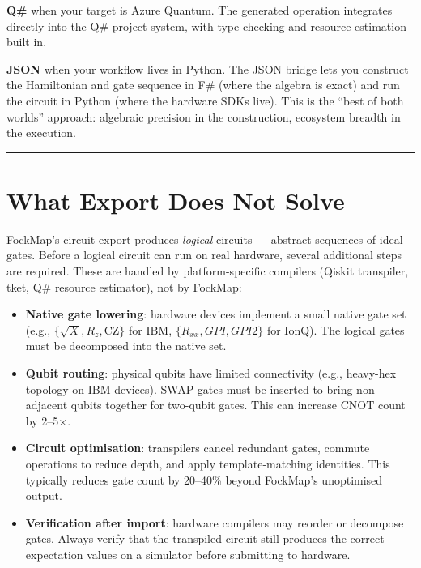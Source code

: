 \documentclass[
  11pt,
  oneside]{book}
\providecommand{\tightlist}{%
  \setlength{\itemsep}{0pt}\setlength{\parskip}{0pt}}
\begin{document}
\textbf{Q\#} when your target is Azure Quantum. The generated operation
integrates directly into the Q\# project system, with type checking and
resource estimation built in.

\textbf{JSON} when your workflow lives in Python. The JSON bridge lets
you construct the Hamiltonian and gate sequence in F\# (where the
algebra is exact) and run the circuit in Python (where the hardware SDKs
live). This is the ``best of both worlds'' approach: algebraic precision
in the construction, ecosystem breadth in the execution.

\begin{center}\rule{0.5\linewidth}{0.5pt}\end{center}

\section{What Export Does Not Solve}\label{what-export-does-not-solve}

FockMap's circuit export produces \emph{logical} circuits --- abstract
sequences of ideal gates. Before a logical circuit can run on real
hardware, several additional steps are required. These are handled by
platform-specific compilers (Qiskit transpiler, tket, Q\# resource
estimator), not by FockMap:

\begin{itemize}
\tightlist
\item
  \textbf{Native gate lowering}: hardware devices implement a small
  native gate set (e.g., \(\{\sqrt{X}, R_z, \text{CZ}\}\) for IBM,
  \(\{R_{xx}, GPI, GPI2\}\) for IonQ). The logical gates must be
  decomposed into the native set.
\item
  \textbf{Qubit routing}: physical qubits have limited connectivity
  (e.g., heavy-hex topology on IBM devices). SWAP gates must be inserted
  to bring non-adjacent qubits together for two-qubit gates. This can
  increase CNOT count by 2--5$\times$.
\item
  \textbf{Circuit optimisation}: transpilers cancel redundant gates,
  commute operations to reduce depth, and apply template-matching
  identities. This typically reduces gate count by 20--40\% beyond
  FockMap's unoptimised output.
\item
  \textbf{Verification after import}: hardware compilers may reorder or
  decompose gates. Always verify that the transpiled circuit still
  produces the correct expectation values on a simulator before
  submitting to hardware.
\end{itemize}
\end{document}
